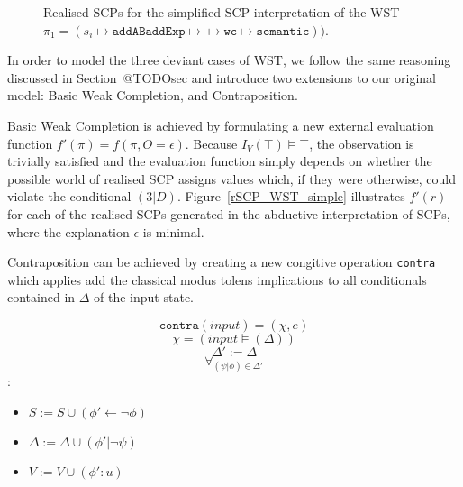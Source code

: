 \begin{figure}
\label{fig:rSCP_WST_simple}
\caption{Realised SCPs for the simplified SCP interpretation of the WST $\pi_1=(s_i \longmapsto \texttt{addAB} \texttt{addExp} \longmapsto \longmapsto \texttt{wc} \longmapsto \texttt{semantic}))$.}
\end{figure}

In order to model the three deviant cases of WST, we follow the same reasoning discussed in Section~@TODOsec and introduce two extensions to our original model: Basic Weak Completion, and Contraposition.

Basic Weak Completion is achieved by formulating a new external evaluation function $f'(\pi)=f(\pi,O=\epsilon)$. Because $I_V(\top)\models \top$, the observation is trivially satisfied and the evaluation function simply depends on whether the possible world of realised SCP assigns values which, if they were otherwise, could violate the conditional $(3|D)$. Figure~\ref{rSCP_WST_simple} illustrates $f'(r)$ for each of the realised SCPs generated in the abductive interpretation of SCPs, where the explanation $\epsilon$  is minimal.

Contraposition can be achieved by creating a new congitive operation \texttt{contra} which applies add the classical modus tolens implications to all conditionals contained in $\Delta$ of the input state.

\[\texttt{contra}(\textit{input})=(\chi,e)\]
\[\chi=(\textit{input}\models (\Delta))\]
\[\Delta' := \Delta\]
\[\forall_{(\psi|\phi) \in \Delta'}\]:
\begin{itemize}
\item $S:=S \cup (\phi'\leftarrow \lnot \phi)$
\item $\Delta := \Delta\cup (\phi'| \lnot \psi)$
\item $V:=V\cup(\phi':u)$
\end{itemize}



















